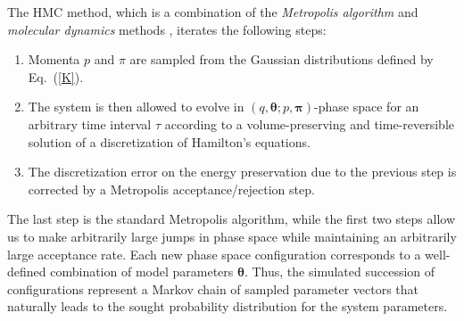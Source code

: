 \documentclass[12pt,a4paper,final]{iopart}
\newcommand{\bt}{\pmb\theta}
\begin{document}
The HMC method, which is a combination of the {\em Metropolis algorithm} \cite{metropolis_1953} and {\em molecular dynamics} methods \cite{alder_1959_MD, rahman_1964_MD}, iterates the following steps:
\begin{enumerate}
  \item
  Momenta $p$ and $\pi$ are sampled from the Gaussian distributions defined by Eq.~(\ref{K}).
  \item
  The system is then allowed to evolve in $\left(q,\bt; p,{\pmb\pi}\right)$-phase space for an arbitrary time interval $\tau$ according to a volume-preserving and time-reversible solution of a discretization of Hamilton's equations.
  \item
  The discretization error on the energy preservation due to the previous step is corrected by a Metropolis acceptance/rejection step.
\end{enumerate}
The last step is the standard Metropolis algorithm, while the first two steps allow us to make arbitrarily large jumps in phase space while maintaining an arbitrarily large acceptance rate. Each new phase space configuration corresponds to a well-defined combination of model parameters $\bt$. Thus, the simulated succession of configurations represent a Markov chain of sampled parameter vectors that naturally leads to the sought probability distribution for the system parameters.
\end{document}
